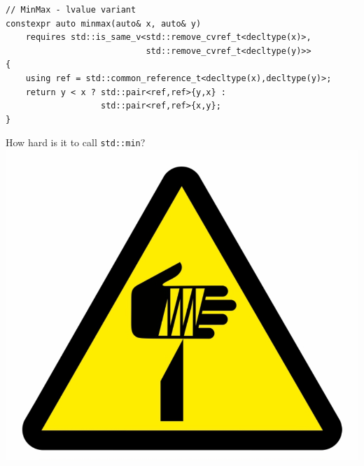 \documentclass[aspectratio=169]{beamer}
\begin{document}
\begin{frame}[fragile]{}
\begin{small}
\begin{verbatim}
// MinMax - lvalue variant
constexpr auto minmax(auto& x, auto& y)
    requires std::is_same_v<std::remove_cvref_t<decltype(x)>, 
                            std::remove_cvref_t<decltype(y)>>
{
    using ref = std::common_reference_t<decltype(x),decltype(y)>;
    return y < x ? std::pair<ref,ref>{y,x} : 
                   std::pair<ref,ref>{x,y};
}
\end{verbatim}
\end{small}
\end{frame}

\begin{frame}[c]
\begin{center}
    \huge How hard is it to call \texttt{std::min}?\\\vspace{1em}
    \pause\includegraphics[height=0.6\textheight]{static/warning.png}
\end{center}
\end{frame}
\end{document}
